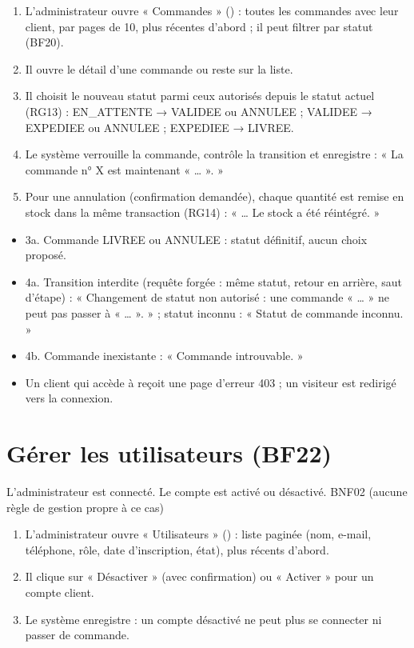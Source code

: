 \begin{enumerate}
  \item L'administrateur ouvre « Commandes » () : toutes les commandes avec leur client, par
        pages de 10, plus récentes d'abord ; il peut filtrer par statut (BF20).
  \item Il ouvre le détail d'une commande ou reste sur la liste.
  \item Il choisit le nouveau statut parmi ceux autorisés depuis le statut actuel (RG13) : EN\_ATTENTE → VALIDEE
        ou ANNULEE ; VALIDEE → EXPEDIEE ou ANNULEE ; EXPEDIEE → LIVREE.
  \item Le système verrouille la commande, contrôle la transition et enregistre : « La commande n° X est
        maintenant « … ». »
  \item Pour une annulation (confirmation demandée), chaque quantité est remise en stock dans la même transaction
        (RG14) : « … Le stock a été réintégré. »
\end{enumerate}

\begin{itemize}
  \item 3a. Commande LIVREE ou ANNULEE : statut définitif, aucun choix proposé.
  \item 4a. Transition interdite (requête forgée : même statut, retour en arrière, saut d'étape) : « Changement de
        statut non autorisé : une commande « … » ne peut pas passer à « … ». » ; statut inconnu : « Statut de
        commande inconnu. »
  \item 4b. Commande inexistante : « Commande introuvable. »
  \item Un client qui accède à  reçoit une page d'erreur 403 ; un visiteur est redirigé vers la
        connexion.
\end{itemize}

\section{Gérer les utilisateurs (BF22)}

  {L'administrateur est connecté.}
  {Le compte est activé ou désactivé.}
  {BNF02 (aucune règle de gestion propre à ce cas)}

\begin{enumerate}
  \item L'administrateur ouvre « Utilisateurs » () : liste paginée (nom, e-mail, téléphone,
        rôle, date d'inscription, état), plus récents d'abord.
  \item Il clique sur « Désactiver » (avec confirmation) ou « Activer » pour un compte client.
  \item Le système enregistre : un compte désactivé ne peut plus se connecter ni passer de commande.
\end{enumerate}

